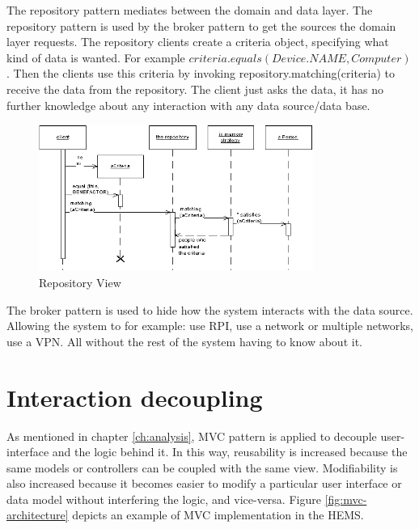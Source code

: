 The repository pattern mediates between the domain and data layer. 
The repository pattern is used by the broker pattern to get the sources the domain layer requests. The repository clients create a criteria object, specifying what kind of data is wanted. For example $criteria.equals(Device.NAME, Computer)$. Then the clients use this criteria by invoking repository.matching(criteria) to receive the data from the repository. The client just asks the data, it has no further knowledge about any interaction with any data source/data base.

\begin{figure}[H]
	\centering
	\includegraphics[width=0.8\textwidth]{7-software/images/repositorySketch.png}
	\caption{Repository View}
	\label{fig:template-view-architecture}
\end{figure}

The broker pattern is used to hide how the system interacts with the data source. Allowing the system to for example: use RPI, use a network or multiple networks, use a VPN. All without the rest of the system having to know about it.

\section{Interaction decoupling}

As mentioned in chapter \ref{ch:analysis}, MVC pattern is applied to decouple user-interface and the logic behind it. In this way, reusability is increased because the same models or controllers can be coupled with the same view. Modifiability is also increased because it becomes easier to modify a particular user interface or data model without interfering the logic, and vice-versa. Figure \ref{fig:mvc-architecture} depicts an example of MVC implementation in the HEMS.

